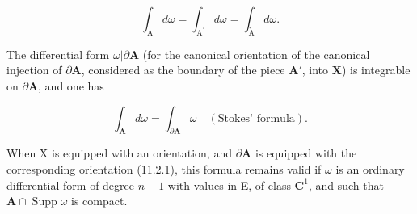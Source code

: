 \[
\int_ {\mathrm{A}} d \omega = \int_ {\mathrm{A} ^ {\prime}} d \omega = \int_ {\mathring{\mathrm{A}}} d \omega.
\]

The differential form \(\omega|\partial\mathbf{A}\) (for the canonical orientation of the canonical injection of \(\partial\mathbf{A}\), considered as the boundary of the piece \(\mathbf{A}'\), into \(\mathbf{X}\)) is integrable on \(\partial\mathbf{A}\), and one has

\[
\int_ {\mathbf {A}} d \omega = \int_ {\partial \mathbf {A}} \omega \quad (\text{Stokes' formula}).
\]

When X is equipped with an orientation, and \(\partial\mathbf{A}\) is equipped with the corresponding orientation (11.2.1), this formula remains valid if \(\omega\) is an ordinary differential form of degree \(n-1\) with values in E, of class \(\mathbf{C}^{1}\), and such that \(\mathbf{A}\cap\operatorname{Supp}\omega\) is compact.

